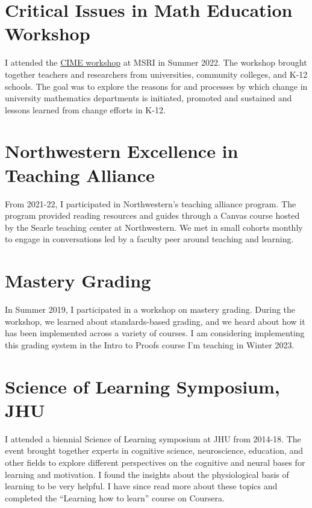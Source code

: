 \documentclass[
]{report}
\begin{document}
\hypertarget{critical-issues-in-math-education-workshop}{%
\section{Critical Issues in Math Education Workshop}\label{critical-issues-in-math-education-workshop}}

I attended the \href{https://www.msri.org/workshops/1028}{CIME workshop} at MSRI in Summer 2022.
The workshop brought together teachers and researchers from universities, community colleges, and K-12 schools. The goal was to explore the reasons for and processes by which change in university mathematics departments is initiated, promoted and sustained and lessons learned from change efforts in K-12.

\hypertarget{northwestern-excellence-in-teaching-alliance}{%
\section{Northwestern Excellence in Teaching Alliance}\label{northwestern-excellence-in-teaching-alliance}}

From 2021-22, I participated in Northwestern's teaching alliance program.
The program provided reading resources and guides through a Canvas course hosted by the Searle teaching center at Northwestern.
We met in small cohorts monthly to engage in conversations led by a faculty peer around teaching and learning.

\hypertarget{mastery-grading}{%
\section{Mastery Grading}\label{mastery-grading}}

In Summer 2019, I participated in a workshop on mastery grading.
During the workshop, we learned about standards-based grading, and we heard about how it has been implemented across a variety of courses.
I am considering implementing this grading system in the Intro to Proofs course I'm teaching in Winter 2023.

\hypertarget{science-of-learning-symposium-jhu}{%
\section{Science of Learning Symposium, JHU}\label{science-of-learning-symposium-jhu}}

I attended a biennial Science of Learning symposium at JHU from 2014-18.
The event brought together experts in cognitive science, neuroscience, education, and other fields to explore different perspectives on the cognitive and neural bases for learning and motivation.
I found the insights about the physiological basis of learning to be very helpful.
I have since read more about these topics and completed the ``Learning how to learn'' course on Coursera.
\end{document}
